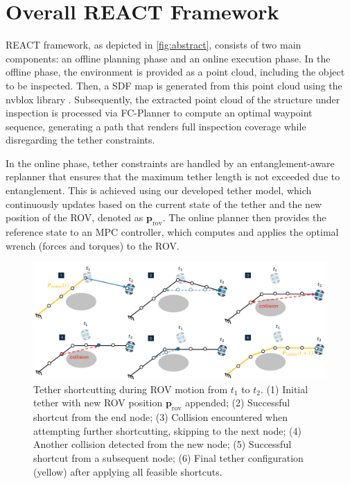 \section{Overall \ac{REACT}  Framework}
\label{sec:framework}
\ac{REACT} framework, as depicted in \ref{fig:abstract}, consists of two main components: an offline planning phase and an online execution phase. In the offline phase, the environment is provided as a point cloud, including the object to be inspected. Then, a \ac{SDF} map is generated from this point cloud using the nvblox library \cite{nvblox}. Subsequently, the extracted point cloud of the structure under inspection is processed via FC-Planner \cite{feng2024fc} to compute an optimal waypoint sequence, generating a path that renders full inspection coverage while disregarding the tether constraints.

In the online phase, tether constraints are handled by an entanglement-aware replanner that ensures that the maximum tether length is not exceeded due to entanglement. This is achieved using our developed tether model, which continuously updates based on the current state of the tether and the new position of the \ac{ROV}, denoted as $\textbf{p}_{\mathrm{rov}}$. The online planner then provides the reference state to an \ac{MPC} controller, which computes and applies the optimal wrench (forces and torques) to the \ac{ROV}.




\begin{figure}[t!]
    \centering
    \includegraphics[width=1\linewidth]{EA-Planner/figures/tether_model.pdf}
    \caption{Tether shortcutting during \ac{ROV} motion from \( t_1 \) to \( t_2 \). (1) Initial tether with new \ac{ROV} position \( \mathbf{p}_{\text{rov}} \) appended; (2) Successful shortcut from the end node; (3) Collision encountered when attempting further shortcutting, skipping to the next node; (4) Another collision detected from the new node; (5) Successful shortcut from a subsequent node; (6) Final tether configuration (yellow) after applying all feasible shortcuts.}
    \label{fig:tether}
\end{figure}



